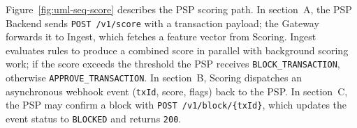 Figure~\ref{fig:uml-seq-score} describes the PSP scoring path. In section~A, the PSP Backend sends \texttt{POST /v1/score} with a transaction payload; the Gateway forwards it to Ingest, which fetches a feature vector from Scoring. Ingest evaluates rules to produce a combined score in parallel with background scoring work; if the score exceeds the threshold the PSP receives \texttt{BLOCK\_TRANSACTION}, otherwise \texttt{APPROVE\_TRANSACTION}. In section~B, Scoring dispatches an asynchronous webhook event (\texttt{txId}, score, flags) back to the PSP. In section~C, the PSP may confirm a block with \texttt{POST /v1/block/\{txId\}}, which updates the event status to \texttt{BLOCKED} and returns \texttt{200}.
